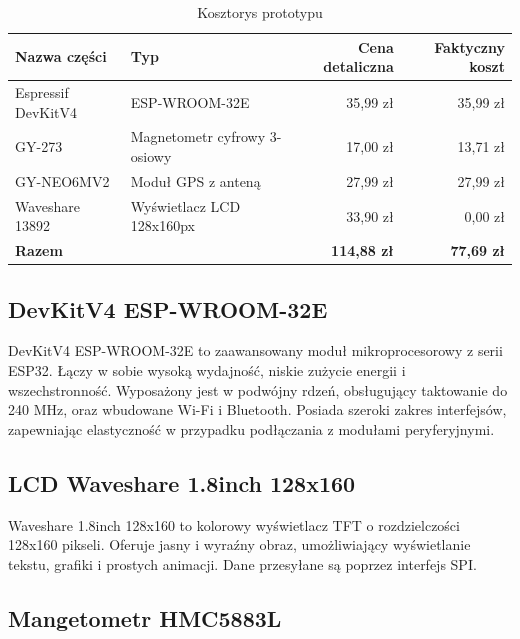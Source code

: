 \begin{table}[h]
    \centering
    \begin{tabular}{|l|l|r|r|}
        \hline
        \textbf{Nazwa części} & \textbf{Typ}                 & \textbf{Cena detaliczna} & \textbf{Faktyczny koszt} \\ \hline
        Espressif DevKitV4    & ESP-WROOM-32E                & 35,99 zł                 & 35,99 zł                 \\ \hline
        GY-273                & Magnetometr cyfrowy 3-osiowy & 17,00 zł                 & 13,71 zł                 \\ \hline
        GY-NEO6MV2            & Moduł GPS z anteną           & 27,99 zł                 & 27,99 zł                 \\ \hline
        Waveshare 13892       & Wyświetlacz LCD 128x160px    & 33,90 zł                 & 0,00 zł                  \\ \hline
        \textbf{Razem}        &                              & \textbf{114,88 zł}       & \textbf{77,69 zł}        \\ \hline
    \end{tabular}
    \caption{Kosztorys prototypu}
\end{table}

\subsection{DevKitV4 ESP-WROOM-32E}

DevKitV4 ESP-WROOM-32E to zaawansowany moduł mikroprocesorowy z serii ESP32. Łączy w sobie  wysoką wydajność, niskie zużycie energii i wszechstronność. Wyposażony jest w podwójny rdzeń, obsługujący taktowanie do 240 MHz, oraz wbudowane Wi-Fi i Bluetooth. Posiada szeroki zakres interfejsów, zapewniając elastyczność w przypadku podłączania z modułami peryferyjnymi.

\subsection{LCD Waveshare 1.8inch 128x160}

Waveshare 1.8inch 128x160 to kolorowy wyświetlacz TFT o rozdzielczości 128x160 pikseli. Oferuje jasny i wyraźny obraz, umożliwiający wyświetlanie tekstu, grafiki i prostych animacji. Dane przesyłane są poprzez interfejs SPI.

\subsection{Mangetometr HMC5883L}

